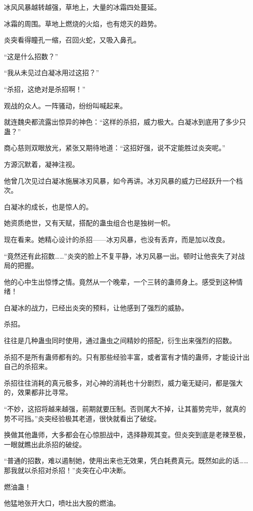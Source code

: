 \begin{this_body}
冰风风暴越转越强，草地上，大量的冰霜四处蔓延。

冰霜的周围。草地上燃烧的火焰，也有熄灭的趋势。

炎突看得瞳孔一缩，召回火蛇，又吸入鼻孔。

“这是什么招数？”

“我从未见过白凝冰用过这招？”

“杀招，这绝对是杀招啊！”

观战的众人。一阵骚动，纷纷叫喊起来。

就连魏央都流露出惊异的神色：“这样的杀招，威力极大。白凝冰到底用了多少只蛊？”

商心慈则双眼放光，紧张又期待地道：“这招好强，说不定能胜过炎突呢。”

方源沉默着，凝神注视。

他曾几次见过白凝冰施展冰刃风暴，如今再讲。冰刃风暴的威力已经跃升一个档次。

白凝冰的成长，也是惊人的。

她资质绝世，又有天赋，搭配的蛊虫组合也是独树一帜。

现在看来。她精心设计的杀招——冰刃风暴，也没有丢弃，而是加以改良。

“竟然还有此招数……”炎突的脸上不复平静，冰刃风暴一出。顿时让他丧失了对战局的把握。

他的心中生出惊悸之情。竟然从一个晚辈，一个三转的蛊师身上。感受到这种情绪！

白凝冰的战力，已经出炎突的预料，让他感到了强烈的威胁。

杀招。

往往是几种蛊虫同时使用，通过蛊虫之间精妙的搭配，衍生出来强烈的招数。

杀招不是所有蛊师都有的。只有那些经验丰富，或者富有才情的蛊师，才能设计出自己的杀招来。

杀招往往消耗的真元极多，对心神的消耗也十分剧烈，威力毫无疑问，都是强大的，效果都非比寻常。

“不妙，这招将越来越强，前期就要压制。否则尾大不掉，让其蓄势完毕，就真的势不可挡。”炎突经验极其老道，很快就看出了破绽。

换做其他蛊师，大多都会在心惊胆战中，选择静观其变。但炎突到底是老辣至极，一眼就瞧出此杀招的破绽。

“普通的招数，难以遏制她，使用出来也无效果，凭白耗费真元。既然如此的话……那我就以杀招对杀招！”炎突在心中决断。

燃油蛊！

他猛地张开大口，喷吐出大股的燃油。


\end{this_body}

